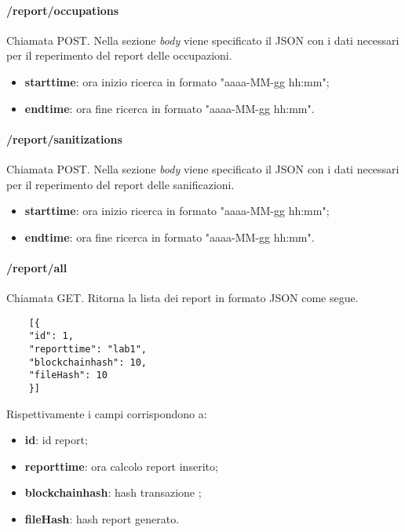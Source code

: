 \paragraph{/report/occupations}
Chiamata POST. Nella sezione \textit{body} viene specificato il JSON con i dati necessari per il reperimento del report delle occupazioni.
\begin{itemize}
	\item \textbf{starttime}: ora inizio ricerca in formato "aaaa-MM-gg hh:mm";
	\item \textbf{endtime}: ora fine ricerca in formato "aaaa-MM-gg hh:mm".
\end{itemize}
\paragraph{/report/sanitizations}
Chiamata POST. Nella sezione \textit{body} viene specificato il JSON con i dati necessari per il reperimento del report delle sanificazioni.
\begin{itemize}
	\item \textbf{starttime}: ora inizio ricerca in formato "aaaa-MM-gg hh:mm";
	\item \textbf{endtime}: ora fine ricerca in formato "aaaa-MM-gg hh:mm".
\end{itemize}
\paragraph{/report/all}
Chiamata GET. Ritorna la lista dei report in formato JSON come segue.	\\
\begin{center}
	\begin{lstlisting}
	[{
	"id": 1,
	"reporttime": "lab1",
	"blockchainhash": 10,
	"fileHash": 10
	}]
	\end{lstlisting}
\end{center}
Rispettivamente i campi corrispondono a:
\begin{itemize}
	\item \textbf{id}: id report;
	\item \textbf{reporttime}: ora calcolo report inserito;
	\item \textbf{blockchainhash}: hash transazione ;
	\item \textbf{fileHash}: hash report generato.
\end{itemize}
